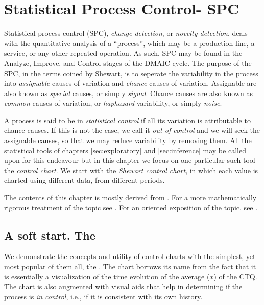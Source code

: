\chapter[SPC]{Statistical Process Control- SPC}
\label{sec:spc}

Statistical process control (SPC), \aka \emph{change detection}, or \emph{novelty detection}, deals with the quantitative analysis of a ``process'', which may be a production line, a service, or any other repeated operation.
As such, SPC may be found in the Analyze, Improve, and Control stages of the DMAIC cycle.
The purpose of the SPC, in the terms coined by Shewart, is to seperate the variability in the process into \emph{assignable} causes of variation and \emph{chance} causes of variation.
Assignable are also known as \emph{special} causes, or simply \emph{signal}.
Chance causes are also known as \emph{common} causes of variation, or \emph{haphazard} variability, or simply \emph{noise}.
 
A process is said to be in \emph{statistical control} if all its variation is attributable to chance causes.
If this is not the case, we call it \emph{out of control} and we will seek the assignable causes, so that we may reduce variability by removing them.
All the statistical tools of chapters \ref{sec:exploratory} and \ref{sec:inference} may be called upon for this endeavour but in this chapter we focus on one particular such tool- the \emph{control chart}.
We start with the \emph{Shewart control chart}, in which each value is charted using different data, from different periods. 



\begin{extra}
The contents of this chapter is mostly derived from \cite{montgomery_introduction_2007}. 
For a more mathematically rigorous treatment of the topic see \cite{basseville_detection_1993}.
For an \R oriented exposition of the topic, see \cite{qiu_introduction_2013}.
\end{extra}

\section{A soft start. The \barxChart}

We demonstrate the concepts and utility of control charts with the simplest, yet most popular of them all, the \barxChart. 
The chart borrows its name from the fact that it is essentially a visualization of the time evolution of the average ($\bar{x}$) of the CTQ. 
The chart is also augmented with visual aids that help in determining if the process is \emph{in control}, i.e., if it is consistent with its own history. 

